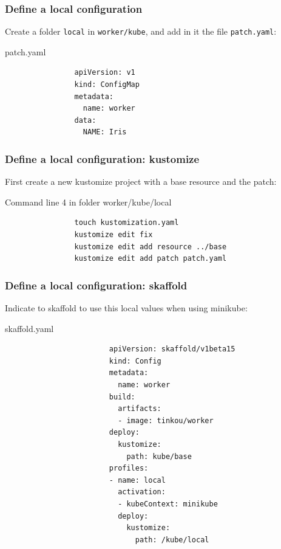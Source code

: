 	\begin{frame}[fragile]
		\frametitle{Define a local configuration}
		
		Create a folder \verb!local! in \verb!worker/kube!, and add in it the file \verb!patch.yaml!:
		\begin{block}{patch.yaml}
			\begin{verbatim}
				apiVersion: v1
				kind: ConfigMap
				metadata:
				  name: worker
				data:
				  NAME: Iris
			\end{verbatim}
		\end{block}
		
		\medskip
		
	\end{frame}
	
	\begin{frame}[fragile]
		\frametitle{Define a local configuration: kustomize}
		
		First create a new kustomize project with a base resource and the patch:
		\begin{block}{Command line 4 in folder worker/kube/local}
			\begin{verbatim}
				touch kustomization.yaml
				kustomize edit fix
				kustomize edit add resource ../base
				kustomize edit add patch patch.yaml
			\end{verbatim}
		\end{block}
		
	\end{frame}
	
	\begin{frame}[fragile]
		\frametitle{Define a local configuration: skaffold}
		
		Indicate to skaffold to use this local values when using minikube:
		\begin{block}{skaffold.yaml}
			\begin{tiny}
				\begin{verbatim}
						apiVersion: skaffold/v1beta15
						kind: Config
						metadata:
						  name: worker
						build:
						  artifacts:
						  - image: tinkou/worker
						deploy:
						  kustomize:
						    path: kube/base
						profiles:
						- name: local
						  activation:
						  - kubeContext: minikube
						  deploy:
						    kustomize:
						      path: /kube/local
				\end{verbatim}
			\end{tiny}
		\end{block}
	
	\end{frame}
	
